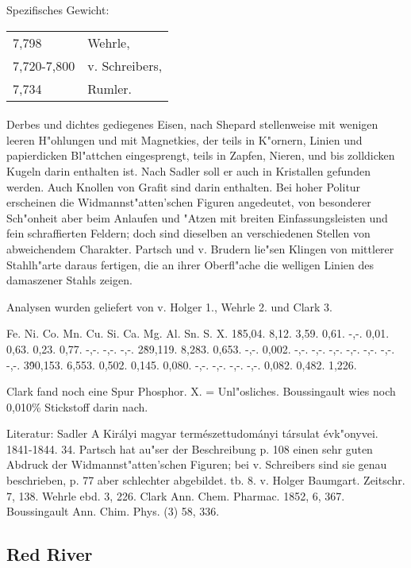 \documentclass[a4paper, 11pt, oneside]{article}
\begin{document}
Spezifisches Gewicht:  
\begin{table}[!ht]
    \centering
    \begin{tabular}{l l}
        7,798 & Wehrle,\\
        7,720-7,800 & v. Schreibers,\\
        7,734 & Rumler.
    \end{tabular}
\end{table}
\paragraph{}
Derbes und dichtes gediegenes Eisen, nach Shepard stellenweise mit wenigen leeren H"ohlungen und mit Magnetkies, der teils in K"ornern, Linien und papierdicken Bl"attchen eingesprengt, teils in Zapfen, Nieren, und bis zolldicken Kugeln darin enthalten ist. Nach Sadler soll er auch in Kristallen gefunden werden. Auch Knollen von Grafit sind darin enthalten. Bei hoher Politur erscheinen die Widmannst"atten'schen Figuren angedeutet, von besonderer Sch"onheit aber beim Anlaufen und "Atzen mit breiten Einfassungsleisten und fein schraffierten Feldern; doch sind dieselben an verschiedenen Stellen von abweichendem Charakter. Partsch und v. Brudern lie"sen Klingen von mittlerer Stahlh"arte daraus fertigen, die an ihrer Oberfl"ache die welligen Linien des damaszener Stahls zeigen.

Analysen wurden geliefert von v. Holger 1., Wehrle 2. und Clark 3.

Fe. Ni. Co. Mn. Cu. Si. Ca. Mg. Al. Sn. S. X.  
1\. 85,04. 8,12. 3,59. 0,61. -,-. 0,01. 0,63. 0,23. 0,77. -,-. -,-. -,-.  
2\. 89,119. 8,283. 0,653. -,-. 0,002. -,-. -,-. -,-. -,-. -,-. -,-. -,-.  
3\. 90,153. 6,553. 0,502. 0,145. 0,080. -,-. -,-. -,-. -,-. 0,082. 0,482. 1,226.

Clark fand noch eine Spur Phosphor. X. = Unl"osliches. Boussingault wies noch 0,010\% Stickstoff darin nach.

Literatur: Sadler A Királyi magyar természettudományi társulat évk"onyvei. 1841-1844. 34. Partsch hat au"ser der Beschreibung p. 108 einen sehr guten Abdruck der Widmannst"atten'schen Figuren; bei v. Schreibers sind sie genau beschrieben, p. 77 aber schlechter abgebildet. tb. 8. v. Holger Baumgart. Zeitschr. 7, 138. Wehrle ebd. 3, 226. Clark Ann. Chem. Pharmac. 1852, 6, 367. Boussingault Ann. Chim. Phys. (3) 58, 336.

\subsection{Red River}
\normalsize
\end{document}
